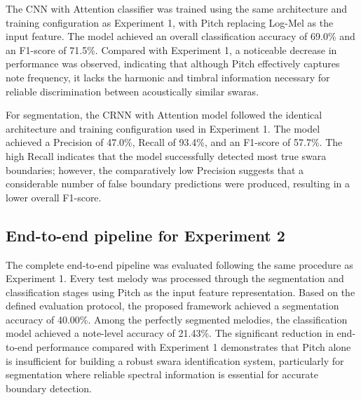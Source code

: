 The CNN with Attention classifier was trained using the same architecture and training configuration as Experiment 1, with Pitch replacing Log-Mel as the input feature. The model achieved an overall classification accuracy of 69.0\% and an F1-score of 71.5\%. Compared with Experiment 1, a noticeable decrease in performance was observed, indicating that although Pitch effectively captures note frequency, it lacks the harmonic and timbral information necessary for reliable discrimination between acoustically similar swaras.


For segmentation, the CRNN with Attention model followed the identical architecture and training configuration used in Experiment 1. The model achieved a Precision of 47.0\%, Recall of 93.4\%, and an F1-score of 57.7\%. The high Recall indicates that the model successfully detected most true swara boundaries; however, the comparatively low Precision suggests that a considerable number of false boundary predictions were produced, resulting in a lower overall F1-score.


\subsection*{End-to-end pipeline for Experiment 2}

The complete end-to-end pipeline was evaluated following the same procedure as Experiment 1. Every test melody was processed through the segmentation and classification stages using Pitch as the input feature representation. Based on the defined evaluation protocol, the proposed framework achieved a segmentation accuracy of 40.00\%. Among the perfectly segmented melodies, the classification model achieved a note-level accuracy of 21.43\%. The significant reduction in end-to-end performance compared with Experiment 1 demonstrates that Pitch alone is insufficient for building a robust swara identification system, particularly for segmentation where reliable spectral information is essential for accurate boundary detection.


